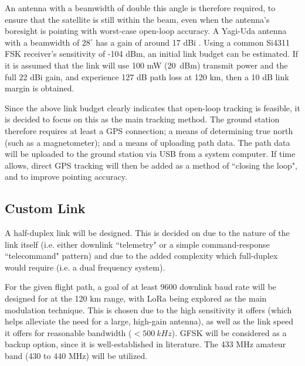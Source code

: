 An antenna with a beamwidth of double this angle is therefore required, to ensure that the satellite is still within the beam, even when the antenna's boresight is pointing with worst-case open-loop accuracy. A Yagi-Uda antenna with a beamwidth of $28^\circ$ has a gain of around 17 dBi \cite{paper-yagiGainBeamwidth}. Using a common Si4311 FSK receiver's sensitivity of -104 dBm, an initial link budget can be estimated. If it is assumed that the link will use 100 mW (\SI{20}{dBm}) transmit power and the full 22 dBi gain, and experience 127 dB path loss at 120 km, then a 10 dB link margin is obtained.

Since the above link budget clearly indicates that open-loop tracking is feasible, it is decided to focus on this as the main tracking method. The ground station therefore requires at least a GPS connection; a means of determining true north (such as a magnetometer); and a means of uploading path data. The path data will be uploaded to the ground station via USB from a system computer. If time allows, direct GPS tracking will then be added as a method of ``closing the loop", and to improve pointing accuracy.

\subsection{Custom Link}
A half-duplex link will be designed. This is decided on due to the nature of the link itself (i.e. either downlink ``telemetry" or a simple command-response ``telecommand" pattern) and due to the added complexity which full-duplex would require (i.e. a dual frequency system).

For the given flight path, a goal of at least 9600 downlink baud rate will be designed for at the 120 km range, with LoRa being explored as the main modulation technique. This is chosen due to the high sensitivity it offers (which helps alleviate the need for a large, high-gain antenna), as well as the link speed it offers for reasonable bandwidth ($< \SI{500}{kHz}$). GFSK will be considered as a backup option, since it is well-established in literature. The 433 MHz amateur band (430 to 440 MHz) will be utilized.